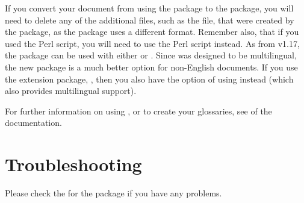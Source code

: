 \documentclass{nlctdoc}
\begin{document}
If you convert your document from using the  package
to the  package, you will need to delete any of
the additional files, such as the  file, that were
created by the  package, as the 
package uses a different format. 
Remember also, that if you used the  Perl script,
you will need to use the  Perl script 
instead. As from v1.17, the  package can be
used with either  or . Since
 was designed to be multilingual, the 
new  package is a much better option for 
non-English documents. If you use the extension package,
, then you also have the option of using
 instead (which also provides multilingual support).

For further information on using ,
 or  to create your glossaries, see
of the  documentation.

\section{Troubleshooting}

Please check the  
for the  package if you have any
problems.

\PrintIndex
\end{document}
